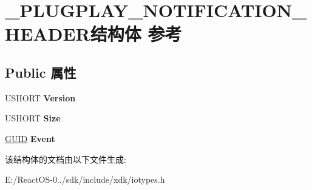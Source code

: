 \hypertarget{struct___p_l_u_g_p_l_a_y___n_o_t_i_f_i_c_a_t_i_o_n___h_e_a_d_e_r}{}\section{\+\_\+\+P\+L\+U\+G\+P\+L\+A\+Y\+\_\+\+N\+O\+T\+I\+F\+I\+C\+A\+T\+I\+O\+N\+\_\+\+H\+E\+A\+D\+E\+R结构体 参考}
\label{struct___p_l_u_g_p_l_a_y___n_o_t_i_f_i_c_a_t_i_o_n___h_e_a_d_e_r}
\subsection*{Public 属性}
\begin{DoxyCompactItemize}
\item 
\mbox{\label{struct___p_l_u_g_p_l_a_y___n_o_t_i_f_i_c_a_t_i_o_n___h_e_a_d_e_r_ad6a915ce8c1a6a3d440b5cf571dd3e9f}} 
U\+S\+H\+O\+RT {\bfseries Version}
\item 
\mbox{\label{struct___p_l_u_g_p_l_a_y___n_o_t_i_f_i_c_a_t_i_o_n___h_e_a_d_e_r_a0e729cf033dbc876a4a04286de3c9fa0}} 
U\+S\+H\+O\+RT {\bfseries Size}
\item 
\mbox{\label{struct___p_l_u_g_p_l_a_y___n_o_t_i_f_i_c_a_t_i_o_n___h_e_a_d_e_r_a64265e0dcd91a1537113876dd78a425e}} 
\hyperlink{interface_g_u_i_d}{G\+U\+ID} {\bfseries Event}
\end{DoxyCompactItemize}


该结构体的文档由以下文件生成\+:\begin{DoxyCompactItemize}
\item 
E\+:/\+React\+O\+S-\/0../sdk/include/xdk/iotypes.\+h\end{DoxyCompactItemize}
